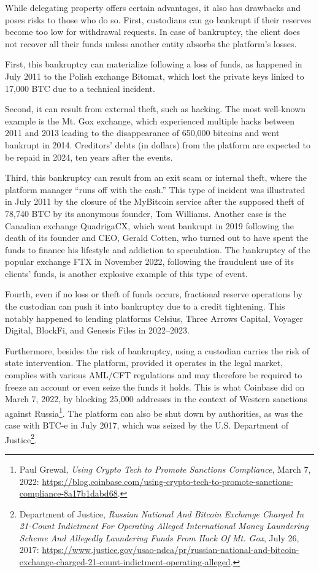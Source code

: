 \documentclass[
  a5paper,
  smalldemyvopaper,10pt,twoside,onecolumn,openright,extrafontsizes,hidelinks]{memoir}
\begin{document}
While delegating property offers certain advantages, it also has
drawbacks and poses risks to those who do so. First, custodians can go
bankrupt if their reserves become too low for withdrawal requests. In
case of bankruptcy, the client does not recover all their funds unless
another entity absorbs the platform's losses.

First, this bankruptcy can materialize following a loss of funds, as
happened in July 2011 to the Polish exchange Bitomat, which lost the
private keys linked to 17,000 BTC due to a technical incident.

Second, it can result from external theft, such as hacking. The most
well-known example is the Mt. Gox exchange, which experienced multiple
hacks between 2011 and 2013 leading to the disappearance of 650,000
bitcoins and went bankrupt in 2014. Creditors' debts (in dollars) from
the platform are expected to be repaid in 2024, ten years after the
events.

Third, this bankruptcy can result from an exit scam or internal theft,
where the platform manager ``runs off with the cash.'' This type of
incident was illustrated in July 2011 by the closure of the MyBitcoin
service after the supposed theft of 78,740 BTC by its anonymous founder,
Tom Williams. Another case is the Canadian exchange QuadrigaCX, which
went bankrupt in 2019 following the death of its founder and CEO, Gerald
Cotten, who turned out to have spent the funds to finance his lifestyle
and addiction to speculation. The bankruptcy of the popular exchange FTX
in November 2022, following the fraudulent use of its clients' funds, is
another explosive example of this type of event.

Fourth, even if no loss or theft of funds occurs, fractional reserve
operations by the custodian can push it into bankruptcy due to a credit
tightening. This notably happened to lending platforms Celsius, Three
Arrows Capital, Voyager Digital, BlockFi, and Genesis Files in
2022--2023.

Furthermore, besides the risk of bankruptcy, using a custodian carries
the risk of state intervention. The platform, provided it operates in
the legal market, complies with various AML/CFT regulations and may
therefore be required to freeze an account or even seize the funds it
holds. This is what Coinbase did on March 7, 2022, by blocking 25,000
addresses in the context of Western sanctions against Russia\footnote{Paul
  Grewal, \emph{Using Crypto Tech to Promote Sanctions Compliance},
  March 7, 2022:
  \url{https://blog.coinbase.com/using-crypto-tech-to-promote-sanctions-compliance-8a17b1dabd68}.}.
The platform can also be shut down by authorities, as was the case with
BTC-e in July 2017, which was seized by the U.S. Department of
Justice\footnote{Department of Justice, \emph{Russian National And
  Bitcoin Exchange Charged In 21-Count Indictment For Operating Alleged
  International Money Laundering Scheme And Allegedly Laundering Funds
  From Hack Of Mt. Gox}, July 26, 2017:
  \url{https://www.justice.gov/usao-ndca/pr/russian-national-and-bitcoin-exchange-charged-21-count-indictment-operating-alleged}.}.
\end{document}
